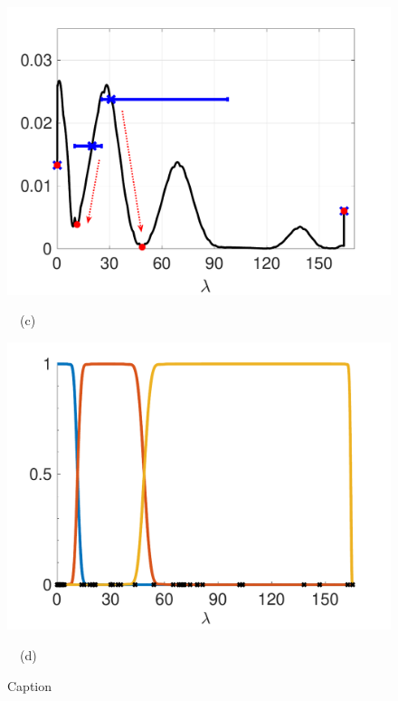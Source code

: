 \documentclass[journal, 10pt]{IEEEtran}
\begin{document}
{\begin{figure}[tbh]
\begin{minipage}[m]{0.49\linewidth}
\centerline{\includegraphics[width=1.1\linewidth]{fig_pdf}}
\centerline{~~\small{(c)}}
\end{minipage}
\begin{minipage}[m]{0.49\linewidth}
\centerline{\includegraphics[width=1.1\linewidth]{fig_updated_fb}}
\centerline{~~\small{(d)}}
\end{minipage}
\caption{Caption}\label{Fig:fb_design}
\end{figure}




}
\end{document}
